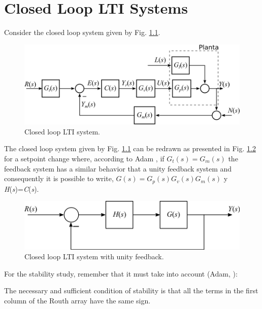 
\chapter{Closed Loop LTI Systems} \label{lc_chapter}

Consider the closed loop system given by Fig. \ref{chpCLfig01Gcl}.

\begin{figure}[H]
	\centering
	\includegraphics[scale=1.2]{./figuras/chapter_glc/lazocerrado.png}
	\caption{Closed loop LTI system.}
	\label{chpCLfig01Gcl}
\end{figure}


The closed loop system given by Fig. \ref{chpCLfig01Gcl} can be redrawn as presented in Fig. \ref{chp_lc_fig02_GH} for a setpoint change where, according to Adam \cite[see Chap. 9]{Adam2018}, if $G_t(s)=G_m(s)$ the feedback system has a similar behavior that a unity feedback system and consequently it is possible to write, $G(s)=G_p(s)G_v(s)G_m(s)$ y \textit{H}(\textit{s})=\textit{C}(\textit{s}).
\begin{figure}[H]
	\centering
	\includegraphics[scale=1.2]{./figuras/chapter_glc/fig_GH.png}
	\caption{Closed loop LTI system with unity feedback.}
	\label{chp_lc_fig02_GH}
\end{figure}

For the stability study, remember that it must take into account (Adam, \cite{Adam2018}):

\begin{theorem} \label{teo02_chp_estab}
	The necessary and sufficient condition of stability is that all the terms in the first column of the Routh array have the same sign.
\end{theorem}

